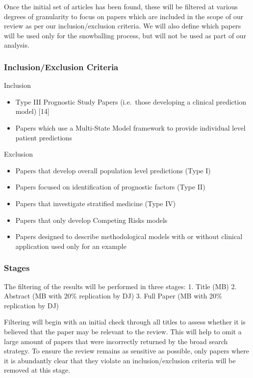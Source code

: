 \documentclass[12pt,PhD,twoside,openright]{muthesis}
\providecommand{\tightlist}{%
  \setlength{\itemsep}{0pt}\setlength{\parskip}{0pt}}
\begin{document}
Once the initial set of articles has been found, these will be filtered at various degrees of granularity to focus on papers which are included in the scope of our review as per our inclusion/exclusion criteria. We will also define which papers will be used only for the snowballing process, but will not be used as part of our analysis.

\hypertarget{inclusionexclusion-criteria}{%
\subsubsection{Inclusion/Exclusion Criteria}\label{inclusionexclusion-criteria}}

Inclusion
\begin{itemize}
\tightlist
\item
  Type III Prognostic Study Papers (i.e.~those developing a clinical prediction model) {[}14{]}
\item
  Papers which use a Multi-State Model framework to provide individual level patient predictions
\end{itemize}
Exclusion
\begin{itemize}
\tightlist
\item
  Papers that develop overall population level predictions (Type I)
\item
  Papers focused on identification of prognostic factors (Type II)
\item
  Papers that investigate stratified medicine (Type IV)
\item
  Papers that only develop Competing Risks models
\item
  Papers designed to describe methodological models with or without clinical application used only for an example
\end{itemize}
\hypertarget{stages}{%
\subsubsection{Stages}\label{stages}}

The filtering of the results will be performed in three stages:
1. Title (MB)
2. Abstract (MB with 20\% replication by DJ)
3. Full Paper (MB with 20\% replication by DJ)

Filtering will begin with an initial check through all titles to assess whether it is believed that the paper may be relevant to the review. This will help to omit a large amount of papers that were incorrectly returned by the broad search strategy. To ensure the review remains as sensitive as possible, only papers where it is abundantly clear that they violate an inclusion/exclusion criteria will be removed at this stage.
\end{document}

